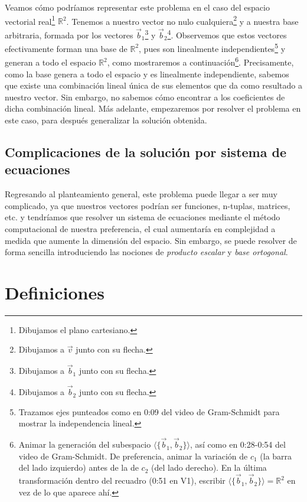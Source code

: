 \documentclass[12pt,dvipsnames]{article}
\numberwithin{equation}{section}
\begin{document}
Veamos cómo podríamos representar este problema en el caso del espacio vectorial real\footnote{Dibujamos el plano cartesiano.} $\mathbb{R}^2$. Tenemos a nuestro vector no nulo cualquiera\footnote{Dibujamos a $\vec{v}$ junto con su flecha.} y a nuestra base arbitraria, formada por los vectores $\vec{b}_1$\footnote{Dibujamos a $\vec{b}_1$ junto con su flecha.} y $\vec{b}_2$\footnote{Dibujamos a $\vec{b}_2$ junto con su flecha.}. Observemos que estos vectores efectivamente forman una base de $\mathbb{R}^2$, pues son linealmente independientes\footnote{Trazamos ejes punteados como en 0:09 del video de Gram-Schmidt para mostrar la independencia lineal.} y generan a todo el espacio $\mathbb{R}^2$, como mostraremos a continuación\footnote{Animar la generación del subespacio $\langle\{\vec{b}_1,\vec{b}_2\}\rangle$, así como en 0:28-0:54 del video de Gram-Schmidt. De preferencia, animar la variación de $c_1$ (la barra del lado izquierdo) antes de la de $c_2$ (del lado derecho). En la última transformación dentro del recuadro (0:51 en V1), escribir $\langle\{\vec{b}_1,\vec{b}_2\}\rangle=\mathbb{R}^2$ en vez de lo que aparece ahí.}. Precisamente, como la base genera a todo el espacio y es linealmente independiente, sabemos que existe una combinación lineal única de sus elementos que da como resultado a nuestro vector. Sin embargo, no sabemos cómo encontrar a los coeficientes de dicha combinación lineal. Más adelante, empezaremos por resolver el problema en este caso, para después generalizar la solución obtenida.

\subsection{Complicaciones de la solución por sistema de ecuaciones} \label{Ssec: Complicaciones de la solución por sistema de ecuaciones}

Regresando al planteamiento general, este problema puede llegar a ser muy complicado, ya que nuestros vectores podrían ser funciones, n-tuplas, matrices, etc. y tendríamos que resolver un sistema de ecuaciones \textemdash mediante el método computacional de nuestra preferencia\textemdash, el cual aumentaría en complejidad a medida que aumente la dimensión del espacio. Sin embargo, se puede resolver de forma sencilla introduciendo las nociones de \emph{producto escalar} y \emph{base ortogonal}.


\section{Definiciones}
\end{document}
